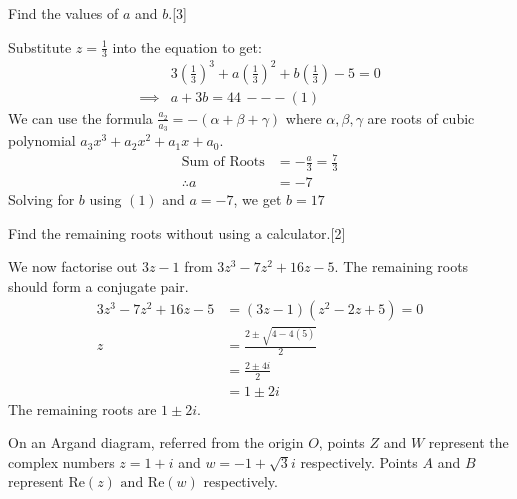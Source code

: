 \documentclass[12pt, a4 paper]{article}
\begin{document}
\begin{outline}[enumerate]
	\2 Find the values of $a$ and $b$.\hfill[3]
	\begin{answer}
		Substitute $z=\frac{1}{3}$ into the equation to get:
		\begin{align*}
			         & 3\left(\frac{1}{3}\right)^3+a\left(\frac{1}{3}\right)^2+b\left(\frac{1}{3}\right)-5=0 \\
			\implies & a+3b=44\,---(1)
		\end{align*}
		We can use the formula $\frac{a_2}{a_3}=-(\alpha + \beta + \gamma)$ where $\alpha,\beta,\gamma$ are roots of cubic polynomial $a_3x^3+a_2x^2+a_1x+a_0$.
		\begin{align*}
			\textrm{Sum of Roots} & =-\frac{a}{3} = \frac{7}{3} \\
			\therefore a          & = -7
		\end{align*}
		Solving for $b$ using $(1)$ and $a=-7$, we get $b=17$
	\end{answer}

	\2 Find the remaining roots without using a calculator.\hfill[2]
	\begin{answer}
		We now factorise out $3z-1$ from $3z^3-7z^2+16z-5$. The remaining roots should form a conjugate pair.
		\begin{align*}
			3z^3-7z^2+16z-5 & = (3z-1)(z^2-2z+5)=0           \\
			z               & = \frac{2\pm \sqrt{4-4(5)}}{2} \\
			                & = \frac{2\pm 4i}{2}            \\
			                & = 1\pm 2i
		\end{align*}
		The remaining roots are $1\pm2i$.
	\end{answer}

	\1 On an Argand diagram, referred from the origin $O$, points $Z$ and $W$ represent the complex numbers $z=1+i$ and $w=-1+\sqrt{3}i$ respectively. Points $A$ and $B$ represent $\textrm{Re}(z) \textrm{ and } \textrm{Re}(w)$ respectively. %


\end{outline}
\end{document}
